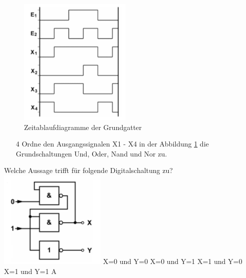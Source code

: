 \begin{figure}[H]
	\centering
	\includegraphics[scale=0.8]{Digitaltechnik/Bilder/TC707.png}
	\caption{Zeitablaufdiagramme der Grundgatter}
	\label{Grundgatter}
	\end{figure}



\begin{enumerate}
		\item[4] Ordne den Ausgangssignalen X1 - X4 in der Abbildung \ref{Grundgatter} die Grundschaltungen Und, Oder, Nand und Nor zu.\\ 
	\end{enumerate}


{Welche Aussage trifft für folgende Digitalschaltung zu?\\ \includegraphics[scale=0.65]{Digitaltechnik/Bilder/TC704.png}}%
{X=0 und Y=0}%
{X=0 und Y=1}%
{X=1 und Y=0}%
{X=1 und Y=1}%
{A}%